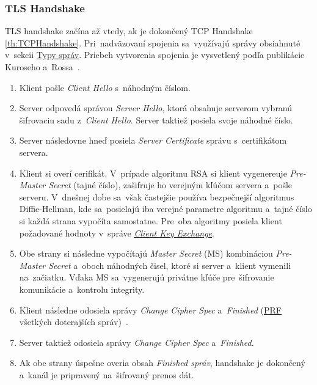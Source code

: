 \subsubsection{TLS Handshake}

TLS handshake začína až vtedy, ak je dokončený TCP Handshake \ref{th:TCPHandshake}. Pri~nadväzovaní spojenia sa~využívajú správy obsiahnuté v~sekcii \hyperref[message_type]{Typy správ}. Priebeh vytvorenia spojenia je vysvetlený podľa publikácie Kuroseho a~Rossa~\cite{kurose_ross_2021}.

\begin{enumerate}
    \item Klient pošle \textit{Client Hello} s~náhodným číslom.
    
    \item Server odpovedá správou \textit{Server Hello}, ktorá obsahuje serverom vybranú šifrovaciu sadu  z~\textit{Client Hello}. Server taktiež posiela svoje náhodné číslo.
    
    \item Server následovne hneď posiela \textit{Server Certificate} správu s~certifikátom servera.
    
    \item Klient si overí cerifikát. V~prípade algoritmu RSA si klient vygenereuje \textit{Pre-Master Secret} (tajné číslo), zašifruje ho verejným kľúčom servera a~pošle serveru. V~dnešnej dobe sa~však častejšie používa bezpečnejší algoritmus Diffie-Hellman, kde sa~posielajú iba verejné parametre algoritmu a~tajné číslo si každá strana vypočíta samostatne. Pre~oba algoritmy posiela klient požadované hodnoty v~správe \textit{\hyperref[th:client_key_exchange]{Client Key Exchange}}. 
    
    \item Obe strany si následne vypočítajú \textit{Master Secret} (MS) kombináciou \textit{Pre-Master Secret} a~oboch náhodných čisel, ktoré si server a~klient vymenili na~začiatku. Vďaka MS sa~vygenerujú privátne kľúče pre~šifrovanie komunikácie a~kontrolu integrity.
    
    \item Klient následne odosiela správy \textit{Change Cipher Spec} a~\textit{Finished} (\hyperref[th:prf]{PRF} všetkých doterajších správ)~\cite{rfc5246}.  
    
    \item Server taktiež odosiela správy \textit{Change Cipher Spec} a~\textit{Finished}.

    \item Ak obe strany úspešne overia obsah \textit{Finished správ}, handshake je dokončený a~kanál je pripravený na~šifrovaný prenos dát.
\end{enumerate}

